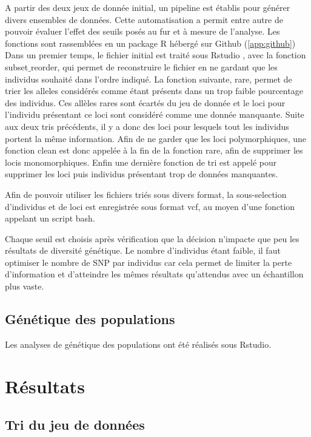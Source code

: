\documentclass[12pt,a4paper,notitlepage]{article}
\begin{document}
A partir des deux jeux de donnée initial, un pipeline est établis pour générer divers ensembles de données. Cette automatisation a permit entre autre de pouvoir évaluer l'effet des seuils posés au fur et à mesure de l'analyse. Les fonctions sont rassemblées en un package R hébergé sur Github (\autoref{app:github})
Dans un premier temps, le fichier initial est traité sous Rstudio \citep{RTeam2017}, avec la fonction subset$\_$reorder, qui permet de reconstruire le fichier en ne gardant que les individus souhaité dans l'ordre indiqué. La fonction suivante, rare, permet de trier les alleles considérés comme étant présents dans un trop faible pourcentage des individus. Ces allèles rares sont écartés du jeu de donnée et le loci pour l'individu présentant ce loci sont considéré comme une donnée manquante. Suite aux deux tris précédents, il y a donc des loci pour lesquels tout les individus portent la même information. Afin de ne garder que les loci polymorphiques, une fonction clean est donc appelée à la fin de la fonction rare, afin de supprimer les locis monomorphiques.
Enfin une dernière fonction de tri est appelé pour supprimer les loci puis individus présentant trop de données manquantes. 

Afin de pouvoir utiliser les fichiers triés sous divers format, la sous-selection d'individus et de loci est enregistrée sous format vcf, au moyen d'une fonction appelant un script bash.


Chaque seuil est choisis après vérification que la décision n'impacte que peu les résultats de diversité génétique.
Le nombre d'individus étant faible, il faut optimiser le nombre de SNP par individus car cela permet de limiter la perte d'information et d'atteindre les mêmes résultats qu'attendus avec un échantillon plus vaste. \citep{Nazareno2017}

\subsection{Génétique des populations}

Les analyses de génétique des populations ont été réalisés sous Rstudio.\citep{RTeam2017}

\section{Résultats}

\subsection{Tri du jeu de données}
\end{document}
